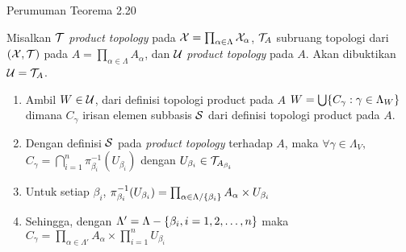 \begin{frame}{Perumuman Teorema 2.20}
    \begin{tcolorbox}[enhanced,title=Teorema 2.35 (Bukti), frame style tile={width=\paperwidth}{\wallpaper}]
        Misalkan $\nT$ \textit{product topology} pada $\nX = \prod_{\alpha \in \Lambda}\nX_\alpha$, 
        $\nT_A$ subruang topologi dari $(\nX,\nT)$ pada $A = \prod_{\alpha \in \Lambda}A_\alpha$, dan 
        $\nU$ \textit{product topology} pada $A$. Akan dibuktikan $\nU = \nT_A$.
        \begin{enumerate}
            \item Ambil $W \in \nU$, dari definisi topologi product pada $A$
            $W=\bigcup\set*{C_\gamma : \gamma \in \Lambda_W}$ dimana $C_\gamma$ irisan 
            elemen subbasis $\nS$ dari definisi topologi product pada $A$.
            \item Dengan definisi $\nS$ pada \textit{product topology} terhadap $A$, maka $\forall\gamma\in\Lambda_V,$ 
            $C_{\gamma}=\bigcap_{i=1}^n \pi_{\beta_i}^{-1}(U_{\beta_i})$ dengan $U_{\beta_i}\in\nT_{A_{\beta_i}}$
            \item Untuk setiap $\beta_i$, $\pi_{\beta_i}^{-1}(U_{\beta_i}) = \prod_{\alpha\in\Lambda/\set{\beta_i}} A_\alpha \times U_{\beta_i}$
            \item Sehingga, dengan $\Lambda'=\Lambda-\set*{\beta_i,i=1,2,\dots,n}$ maka 
            $C_{\gamma}=\prod_{\alpha\in\Lambda'}A_\alpha\times\prod_{i=1}^n U_{\beta_i}$
        \end{enumerate}
    \end{tcolorbox}
\end{frame}

